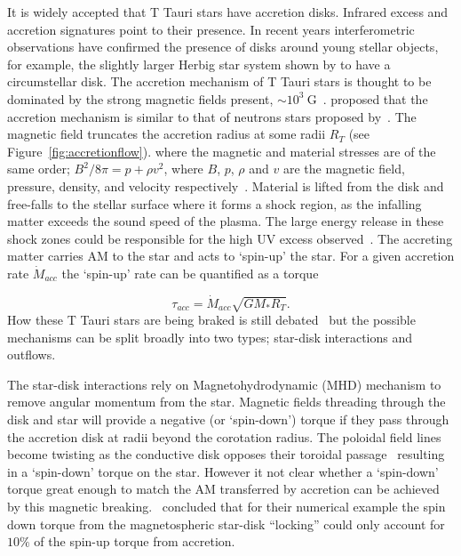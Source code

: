 \documentclass[fleqn,usenatbib]{mnras}
\begin{document}
It is widely accepted that T Tauri stars have accretion disks. Infrared excess and accretion signatures point to their presence. In recent years interferometric observations have confirmed the presence of disks around young stellar objects, for example, the slightly larger Herbig star system shown by \cite{2012ApJ...752...11K} to have a circumstellar disk. The accretion mechanism of T Tauri stars is thought to be dominated by the strong magnetic fields present, $\sim 10^{3}~\textrm{G}$~\citep{2012MNRAS.426.2901K}. \citet{1991ApJ...370L..39K} proposed that the accretion mechanism is similar to that of neutrons stars proposed by~\citet{1977ApJ...217..578G}. The magnetic field truncates the accretion radius at some radii $R_T$ (see Figure~\ref{fig:accretionflow}). where the magnetic and material stresses are of the same order; $B^2/8\pi = p + \rho v^2$, where $B$, $p$, $\rho$ and $v$ are the magnetic field, pressure, density, and velocity respectively~\citep{Romanova:2002hc}. Material is lifted from the disk and free-falls to the stellar surface where it forms a shock region, as the infalling matter exceeds the sound speed of the plasma. The large energy release in these shock zones could be responsible for the high UV excess observed~\citep{2009A&A...508.1117Z}. The accreting matter carries AM to the star and acts to `spin-up' the star. For a given accretion rate $\dot{M}_{acc}$ the `spin-up' rate can be quantified as a torque~\citep{2005ApJ...632L.135M}

\begin{equation}
    \tau_{acc} = \dot{M}_{acc}\sqrt{GM_{\ast}R_{T}}.
    \label{eq:accretion_torque}
\end{equation}
How these T Tauri stars are being braked is still debated~\citep{Hartmann:2016gu} but the possible mechanisms can be split broadly into two types; star-disk interactions and outflows. 


The star-disk interactions rely on Magnetohydrodynamic (MHD) mechanism to remove angular momentum from the star. Magnetic fields threading through the disk and star will provide a negative (or `spin-down') torque if they pass through the accretion disk at radii beyond the corotation radius. The poloidal field lines become twisting as the conductive disk opposes their toroidal passage~\citep{Uzdensky:2002dg} resulting in a `spin-down' torque on the star.  However it not clear whether a `spin-down' torque great enough to match the AM transferred by accretion can be achieved by this magnetic breaking.~\citet{2009A&A...508.1117Z} concluded that for their numerical example the spin down torque from the magnetospheric star-disk ``locking'' could only account for $10\%$ of the spin-up torque from accretion.
\end{document}

